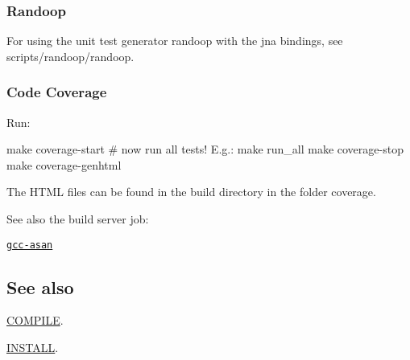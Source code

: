 \subsubsection*{Randoop}

For using the unit test generator randoop with the jna bindings, see {\ttfamily scripts/randoop/randoop}.

\subsubsection*{Code Coverage}

Run\+: \begin{DoxyVerb}    make coverage-start
    # now run all tests! E.g.:
    make run_all
    make coverage-stop
    make coverage-genhtml
\end{DoxyVerb}


The H\+T\+ML files can be found in the build directory in the folder {\ttfamily coverage}.

See also the build server job\+:


\begin{DoxyItemize}
\item \href{https://build.libelektra.org/job/elektra-incremental/}{\tt gcc-\/asan}
\end{DoxyItemize}

\subsection*{See also}


\begin{DoxyItemize}
\item \hyperlink{doc_COMPILE_md}{C\+O\+M\+P\+I\+LE}.
\item \hyperlink{doc_INSTALL_md}{I\+N\+S\+T\+A\+LL}. 
\end{DoxyItemize}